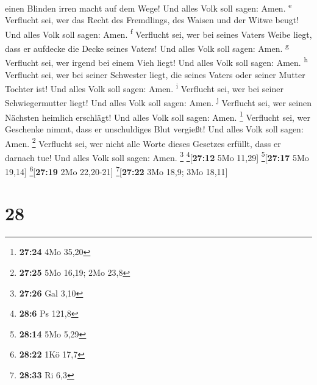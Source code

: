 einen Blinden irren macht auf dem Wege! Und alles Volk soll sagen: Amen.
\textsuperscript{e}  Verflucht sei, wer das Recht des
Fremdlings, des Waisen und der Witwe beugt! Und alles Volk soll sagen:
Amen. \textsuperscript{f}  Verflucht sei, wer bei seines
Vaters Weibe liegt, dass er aufdecke die Decke seines Vaters! Und alles
Volk soll sagen: Amen. \textsuperscript{g}  Verflucht
sei, wer irgend bei einem Vieh liegt! Und alles Volk soll sagen: Amen.
\textsuperscript{h}  Verflucht sei, wer bei seiner
Schwester liegt, die seines Vaters oder seiner Mutter Tochter ist! Und
alles Volk soll sagen: Amen. \textsuperscript{i} 
Verflucht sei, wer bei seiner Schwiegermutter liegt! Und alles Volk soll
sagen: Amen. \textsuperscript{j}  Verflucht sei, wer
seinen Nächsten heimlich erschlägt! Und alles Volk soll sagen: Amen.
\footnote{\textbf{27:24} 4Mo 35,20}  Verflucht sei, wer
Geschenke nimmt, dass er unschuldiges Blut vergießt! Und alles Volk soll
sagen: Amen. \footnote{\textbf{27:25} 5Mo 16,19; 2Mo 23,8}
 Verflucht sei, wer nicht alle Worte dieses Gesetzes
erfüllt, dass er darnach tue! Und alles Volk soll sagen: Amen.
\footnote{\textbf{27:26} Gal 3,10} \footnote{\textbf{28:6} Ps 121,8}{[}\textbf{27:12}
5Mo 11,29{]} \footnote{\textbf{28:14} 5Mo 5,29}{[}\textbf{27:17} 5Mo
19,14{]} \footnote{\textbf{28:22} 1Kö 17,7}{[}\textbf{27:19} 2Mo
22,20-21{]} \footnote{\textbf{28:33} Ri 6,3}{[}\textbf{27:22} 3Mo 18,9;
3Mo 18,11{]}

\hypertarget{section-27}{%
\section{28}\label{section-27}}

